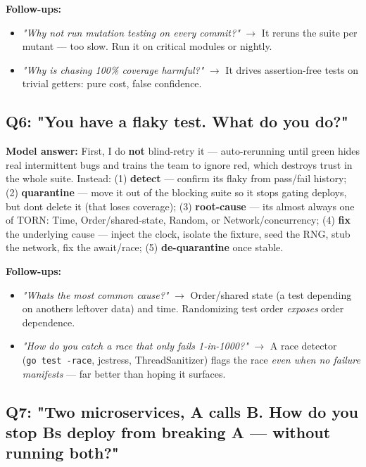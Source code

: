 \documentclass[11pt]{article}
\providecommand{\tightlist}{\setlength{\itemsep}{1pt}\setlength{\parskip}{0pt}}
\begin{document}
\textbf{Follow-ups:}

\begin{itemize}
\tightlist
\item
  \emph{"Why not run mutation testing on every commit?"} \(\rightarrow\) It reruns the suite per mutant --- too slow. Run it on critical modules or nightly.
\item
  \emph{"Why is chasing 100\% coverage harmful?"} \(\rightarrow\) It drives assertion-free tests on trivial getters: pure cost, false confidence.
\end{itemize}

\subsection{Q6: "You have a flaky test. What do you do?"}\label{q6-you-have-a-flaky-test-what-do-you-do}

\textbf{Model answer:} First, I do \textbf{not} blind-retry it --- auto-rerunning until green hides real intermittent bugs and trains the team to ignore red, which destroys trust in the whole suite. Instead: (1) \textbf{detect} --- confirm it\textquotesingle s flaky from pass/fail history; (2) \textbf{quarantine} --- move it out of the blocking suite so it stops gating deploys, but don\textquotesingle t delete it (that loses coverage); (3) \textbf{root-cause} --- it\textquotesingle s almost always one of TORN: Time, Order/shared-state, Random, or Network/concurrency; (4) \textbf{fix} the underlying cause --- inject the clock, isolate the fixture, seed the RNG, stub the network, fix the await/race; (5) \textbf{de-quarantine} once stable.

\textbf{Follow-ups:}

\begin{itemize}
\tightlist
\item
  \emph{"What\textquotesingle s the most common cause?"} \(\rightarrow\) Order/shared state (a test depending on another\textquotesingle s leftover data) and time. Randomizing test order \emph{exposes} order dependence.
\item
  \emph{"How do you catch a race that only fails 1-in-1000?"} \(\rightarrow\) A race detector (\texttt{go\ test\ -race}, jcstress, ThreadSanitizer) flags the race \emph{even when no failure manifests} --- far better than hoping it surfaces.
\end{itemize}

\subsection{Q7: "Two microservices, A calls B. How do you stop B\textquotesingle s deploy from breaking A --- without running both?"}\label{q7-two-microservices-a-calls-b-how-do-you-stop-bs-deploy-from-breaking-a--without-running-both}
\end{document}

